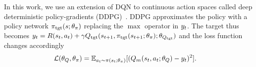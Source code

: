 In this work, we use an extension of DQN to continuous action spaces called
deep deterministic policy-gradients
(DDPG)~\citep{lillicrap2015continuous}. DDPG approximates the
policy with a policy network $\pi_{\text{tgt}}(s; \theta_\pi)$ replacing the $\max$
operator in $y_t$. The target thus becomes 
$ y_t = R(s_t, a_t) + \gamma
Q_{\text{tgt}}(s_{t+1}, \pi_{\text{tgt}}(s_{t+1}; \theta_\pi); \theta_{Q_{\text{tgt}}})$ and the
loss function changes accordingly
%
\newcommand{\policytgt}{\policy_\text{tgt}}%
\begin{align}
  \mathcal{L}(\theta_Q, \theta_\pi) &= \mathbb{E}_{a_t \sim \pi(s_t; \theta_\pi)}[
                                      (Q_m(s_t, a_t; \theta_Q) - y_t)^2].
\end{align}
%



